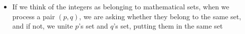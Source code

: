 \documentclass[8pt,a4paper,compress]{beamer}
\begin{document}
\begin{frame}[fragile]
\begin{minipage}{250pt}
\begin{itemize}
\pause
\item If we think of the integers as belonging to mathematical sets, when we process a pair $(p, q)$, we are asking whether they belong to the same set, and if not, we unite $p$'s set and $q$'s set, putting them in the same set
\end{itemize}
\end{minipage}%
\begin{minipage}{60pt}
\hfill {}
\end{minipage}
\end{frame}
\end{document}
